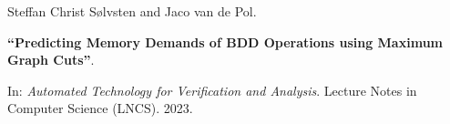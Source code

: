 Steffan Christ Sølvsten and Jaco van de Pol.

{\bf ``Predicting Memory Demands of BDD Operations using Maximum Graph Cuts''}.

In: \emph{Automated Technology for Verification and Analysis}.
Lecture Notes in Computer Science (LNCS). 2023.

\label{cite:2023.atva}